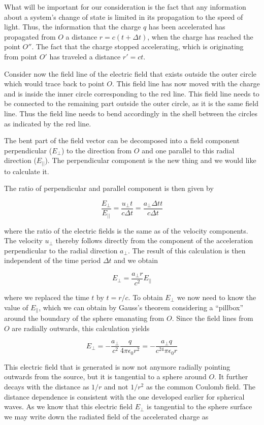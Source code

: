 \documentclass[
  a4paper,
]{book}
\begin{document}
What will be important for our consideration is the fact that any
information about a system's change of state is limited in its
propagation to the speed of light. Thus, the information that the charge
\(q\) has been accelerated has propagated from \(O\) a distance
\(r=c(t+\Delta t)\), when the charge has reached the point \(O''\). The
fact that the charge stopped accelerating, which is originating from
point \(O'\) has traveled a distance \(r'=ct\).

Consider now the field line of the electric field that exists outside
the outer circle which would trace back to point \(O\). This field line
has now moved with the charge and is inside the inner circle
corresponding to the red line. This field line needs to be connected to
the remaining part outside the outer circle, as it is the same field
line. Thus the field line needs to bend accordingly in the shell between
the circles as indicated by the red line.

The bent part of the field vector can be decomposed into a field
component perpendicular (\(E_\perp\)) to the direction from \(O\) and
one parallel to this radial direction (\(E_{||}\)). The perpendicular
component is the new thing and we would like to calculate it.

The ratio of perpendicular and parallel component is then given by

\[
\frac{E_{\perp}}{E_{||}}=\frac{u_{\perp}t}{c\Delta t}=\frac{a_{\perp}\Delta t t }{c\Delta t}
\]

where the ratio of the electric fields is the same as of the velocity
components. The velocity \(u_{\perp}\) thereby follows directly from the
component of the acceleration perpendicular to the radial direction
\(a_{\perp}\). The result of this calculation is then independent of the
time period \(\Delta t\) and we obtain

\[
E_{\perp}=\frac{a_{\perp}r}{c^2}E_{||}
\]

where we replaced the time \(t\) by \(t=r/c\). To obtain \(E_{\perp}\)
we now need to know the value of \(E_{\parallel}\), which we can obtain
by Gauss's theorem considering a ``pillbox'' around the boundary of the
sphere emanating from \(O\). Since the field lines from \(O\) are
radially outwards, this calculation yields

\[
E_{\perp}=-\frac{a_{\perp}}{c^2}\frac{q}{4\pi \epsilon_0 r^2}=-\frac{a_{\perp} q}{c^24\pi \epsilon_0 r}
\]

This electric field that is generated is now not anymore radially
pointing outwards from the source, but it is tangential to a sphere
around \(O\). It further decays with the distance as \(1/r\) and not
\(1/r^2\) as the common Coulomb field. The distance dependence is
consistent with the one developed earlier for spherical waves. As we
know that this electric field \(E_{\perp}\) is tangential to the sphere
surface we may write down the radiated field of the accelerated charge
as
\end{document}
